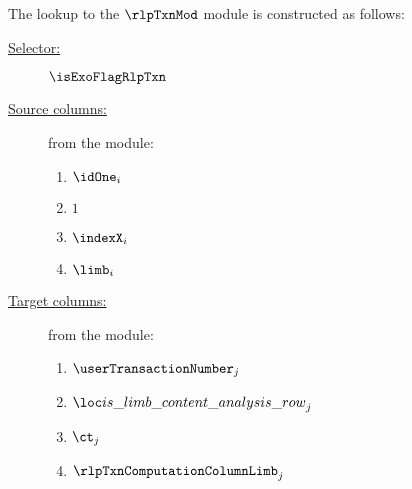 
The lookup to the $\rlpTxnMod$ module is constructed as follows:
\begin{description}
	\item[\underline{Selector:}] $\isExoFlagRlpTxn$
	\item[\underline{Source columns:}] from the \mmioMod{} module:
		\begin{multicols}{3}
			\begin{enumerate}
				\item $\idOne  _{i}$
				\item $1$
				\item $\indexX _{i}$
				\item $\limb   _{i}$
			\end{enumerate}
		\end{multicols}
	\item[\underline{Target columns:}] from the \rlpTxnMod{} module: 
		\begin{multicols}{3}
			\begin{enumerate}
				\item $\userTransactionNumber       			_{j}$
				\item $\locIsLimbContentAnalysisRow 			_{j}$
				\item $\ct                          			_{j}$
				\item $\rlpTxnComputationColumnLimb             _{j}$
			\end{enumerate}
		\end{multicols}
\end{description}

